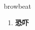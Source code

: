 
\begin{frame}
{\huge browbeat}
\begin{center}
\begin{enumerate}\Large
  \item \textbf{恐吓}
\end{enumerate}
\end{center}
\end{frame}
